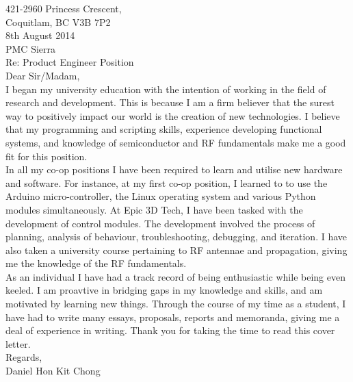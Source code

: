 \documentclass[10pt,a4paper]{article}
\begin{document}
\flushleft
\large
421-2960 Princess Crescent,\\
Coquitlam, BC V3B 7P2 \\
\medskip
8th August 2014 \\
\medskip
PMC Sierra\\
\medskip
Re: Product Engineer Position\\
\medskip
Dear Sir/Madam,\\

\medskip
\hspace{10mm}
I began my university education with the intention of working in the field of research and development. This is because I am a firm believer that the 
surest way to positively impact our world is the creation of new technologies. I believe that my programming and scripting skills, experience 
developing functional systems, and knowledge of semiconductor and RF fundamentals make me a good fit for this position.\\
\medskip
\hspace{10mm}
In all my co-op positions I have been required to learn and utilise new hardware and software. For instance, at my first co-op position, I learned to
to use the Arduino micro-controller, the Linux operating system and various Python modules simultaneously. At Epic 3D Tech, I have been tasked with 
the development of control modules. The development involved the process of planning, analysis of behaviour, troubleshooting, debugging, and iteration. 
I have also taken a university course pertaining to RF antennae and propagation, giving me the knowledge of the RF fundamentals.\\
\medskip
\hspace{10mm}
As an individual I have had a track record of being enthusiastic while being even keeled. 
I am proavtive in bridging gaps in my knowledge and skills, and am motivated by learning new things.
Through the course of my time as a student, I have had to write many essays, proposals, reports and memoranda, giving me a deal of experience in writing.
Thank you for taking the time to read this cover letter.\\


\bigskip
Regards, \\
Daniel Hon Kit Chong
\end{document}
